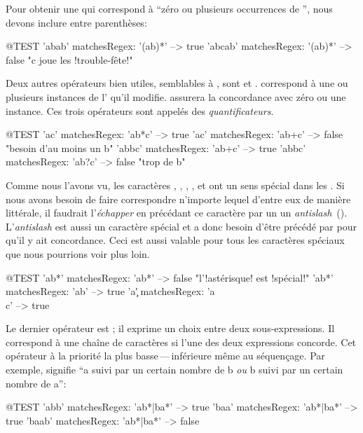 \documentclass[a4paper,10pt,twoside]{book}
\begin{document}
Pour obtenir une \expreg qui correspond à ``zéro ou plusieurs
occurrences de '', nous devons inclure  entre
parenthèses:
\begin{code}{@TEST}
'abab' matchesRegex: '(ab)*'   --> true
'abcab' matchesRegex: '(ab)*' --> false    "c joue les !trouble-fête!"
\end{code} %

Deux autres opérateurs bien utiles, semblables à \ct{*}, sont \ct{+}
et . \ct{+} correspond à une ou plusieurs instances de l'\expreg
qu'il modifie.  assurera la concordance avec zéro ou une
instance.
Ces trois opérateurs sont appelés des \emph{quantificateurs}.
\begin{code}{@TEST}
'ac' matchesRegex: 'ab*c'	   --> true
'ac' matchesRegex: 'ab+c'	  --> false    "besoin d'au moins un b"
'abbc' matchesRegex: 'ab+c' --> true
'abbc' matchesRegex: 'ab?c' --> false    "trop de b"
\end{code}

Comme nous l'avons vu, les caractères \ct{*}, \ct{+}, , \ct{(},
et \ct{)} ont un sens spécial dans les \expregs. Si nous avons besoin
de faire correspondre n'importe lequel d'entre eux de manière
littérale, il faudrait l'\emph{échapper} en précédant ce caractère par
un \escchar \cad un \mbox{\emph{antislash} ().} L'\emph{antislash} est
  aussi un caractère spécial et a donc besoin d'être précédé par
  \escchar pour qu'il y ait concordance. Ceci est aussi valable pour
  tous les caractères spéciaux que nous pourrions voir plus loin.
\begin{code}{@TEST}
'ab*' matchesRegex: 'ab*'  --> false    "l'!astérisque! est !spécial!"
'ab*' matchesRegex: 'ab\*' --> true
'a\c' matchesRegex: 'a\\c'  --> true
\end{code}

Le dernier opérateur est \ct{|}; il exprime un choix entre deux
sous-expressions. Il correspond à une chaîne de caractères si l'une des
deux expressions concorde. Cet opérateur à la priorité la plus
basse\,---\,inférieure même au séquençage.
Par exemple,  signifie ``a suivi par un certain nombre de
b \emph{ou} b suivi par un certain nombre de a'':
\begin{code}{@TEST}
'abb' matchesRegex: 'ab*|ba*'   --> true
'baa' matchesRegex: 'ab*|ba*'	--> true
'baab' matchesRegex: 'ab*|ba*' --> false
\end{code}
\end{document}
